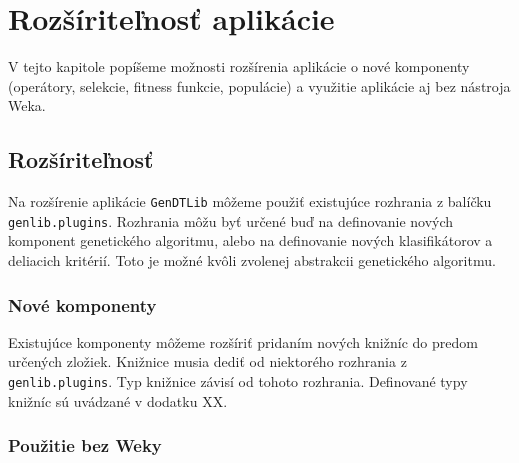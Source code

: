 \chapter{Rozšíriteľnosť aplikácie}\label{kapIII}
V tejto kapitole popíšeme možnosti rozšírenia aplikácie o nové komponenty (operátory, selekcie, fitness funkcie, populácie) a využitie aplikácie aj bez nástroja Weka.

\section{Rozšíriteľnosť}\label{kap4:4.4:Plugin}
Na rozšírenie aplikácie \verb|GenDTLib| môžeme použiť existujúce rozhrania z balíčku \verb|genlib.plugins|. Rozhrania môžu byť určené buď na definovanie nových komponent genetického algoritmu, alebo na definovanie nových klasifikátorov a deliacich kritérií. Toto je možné kvôli zvolenej abstrakcii genetického algoritmu.
\subsection{Nové komponenty}
Existujúce komponenty môžeme rozšíriť pridaním nových knižníc do predom určených zložiek. Knižnice musia dediť od niektorého rozhrania z \verb|genlib.plugins|. Typ knižnice závisí od tohoto rozhrania. Definované typy knižníc sú uvádzané v dodatku XX.

\subsection{Použitie bez Weky}